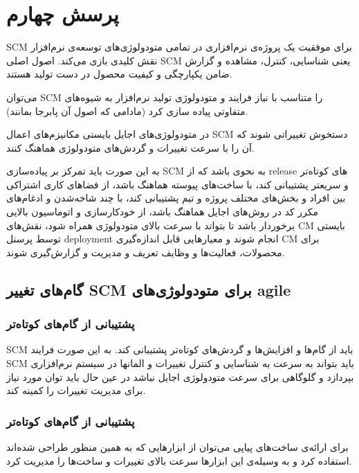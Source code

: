 
\section{پرسش چهارم}
SCM 
برای موفقیت یک پروژه‌ی نرم‌افزاری در تمامی متودولوژی‌های توسعه‌ی نرم‌افزار نقش کلیدی بازی می‌کند.
اصول اصلی SCM یعنی
شناسایی، کنترل، مشاهده و گزارش 
ضامن یکپارچگی و کیفیت محصول در دست تولید هستند.

می‌توان SCM را متناسب با نیاز فرایند و متودولوژی تولید نرم‌افزار به شیوه‌های متفاوتی پیاده سازی کرد (مادامی که اصول آن پابرجا بمانند).

در متودولوژی‌های اجایل بایستی مکانیزم‌های اعمال SCM دستخوش تغییراتی شوند که آن را با سرعت تغییرات و گردش‌های متودولوژی هماهنگ کنند.

به این صورت باید تمرکز بر پیاده‌سازی SCM به نحوی باشد که از release های کوتاه‌تر و سریعتر پشتیبانی کند، با ساخت‌های پیوسته
هماهنگ باشد، از فضا‌های کاری اشتراکی بین افراد و بخش‌های مختلف پروژه و تیم پشتیبانی کند، با چند شاخه‌شدن و ادغام‌های مکرر کد در روش‌های اجایل هماهنگ باشد، از خودکارسازی و اتوماسیون بالایی برخوردار باشد تا بتواند با سرعت بالای متودولوژی همراه شود، نقش‌های CM بایستی توسط پرسنل deployment انجام شوند و معیار‌هایی قابل اندازه‌گیری CM برای محصولات، فعالیت‌ها و وظایف تعریف و مدیریت و گزارش‌گیری شوند.

\subsection{گام‌های تغییر SCM برای متودولوژی‌های agile}
\subsubsection{پشتیبانی از گام‌های کوتاه‌تر}
SCM
باید از گام‌ها و افزایش‌ها و گردش‌های کوتاه‌تر پشتیبانی کند. به این صورت فرایند SCM باید بتواند به سرعت به شناسایی و کنترل تغییرات و المانها در سیستم نرم‌افزاری بپردازد و گلوگاهی برای سرعت متودولوژی اجایل نباشد در عین حال باید توان مورد نیاز برای مدیریت تغییرات را کمینه کند.
\subsubsection{پشتیبانی از گام‌های کوتاه‌تر}
برای ارائه‌ی ساخت‌های پیاپی می‌توان از ابزار‌هایی که به همین منظور طراحی شده‌اند استفاده کرد و به وسیله‌ی این ابزار‌ها سرعت بالای تغییرات و ساخت‌ها را مدیریت کرد.


